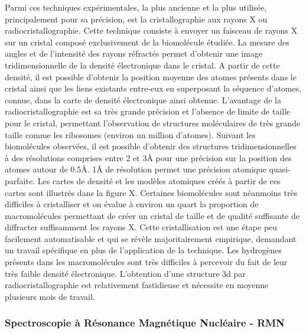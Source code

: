 Parmi ces techniques expérimentales, la plus ancienne et la plus utilisée, principalement pour sa précision, est la cristallographie aux rayons X ou radiocristallographie. Cette technique consiste à envoyer un faisceau de rayons X sur un cristal composé exclusivement de la biomolécule étudiée. La mesure des angles et de l'intensité des rayons réfractés permet d'obtenir une image tridimensionnelle de la densité électronique dans le cristal. A partir de cette densité, il est possible d'obtenir la position moyenne des atomes présents dans le cristal ainsi que les liens existants entre-eux en superposant la séquence d'atomes, connue, dans la carte de densité électronique ainsi obtenue. 
L'avantage de la radiocristallographie est sa très grande précision et l'absence de limite de taille pour le cristal, permettant l'observation de structures moléculaires de très grande taille comme les ribosomes (environ un million d'atomes). Suivant les biomolécules observées, il est possible d'obtenir des structures tridimensionnelles à des résolutions comprises entre 2 et 3\r{A} pour une précision sur la position des atomes autour de 0.5\r{A}. 1\r{A} de résolution permet une précision atomique quasi-parfaite. Les cartes de densité et les modèles atomiques créés à partir de ces cartes sont illustrés dans la figure X. 
Certaines biomolécules sont néanmoins très difficiles à cristalliser et on évalue à environ un quart la proportion de macromolécules permettant de créer un cristal de taille et de qualité suffisante de diffracter suffisamment les rayons X. Cette cristallisation est une étape peu facilement automatisable et qui se révèle majoritairement empirique, demandant un travail spécifique en plus de l'application de la technique. Les hydrogènes présents dans les macromolécules sont très difficiles à percevoir du fait de leur très faible densité électronique. L'obtention d'une structure 3d par radiocristallographie est relativement fastidieuse et nécessite en moyenne plusieurs mois de travail.

\subsubsection{Spectroscopie à Résonance Magnétique Nucléaire - RMN}


